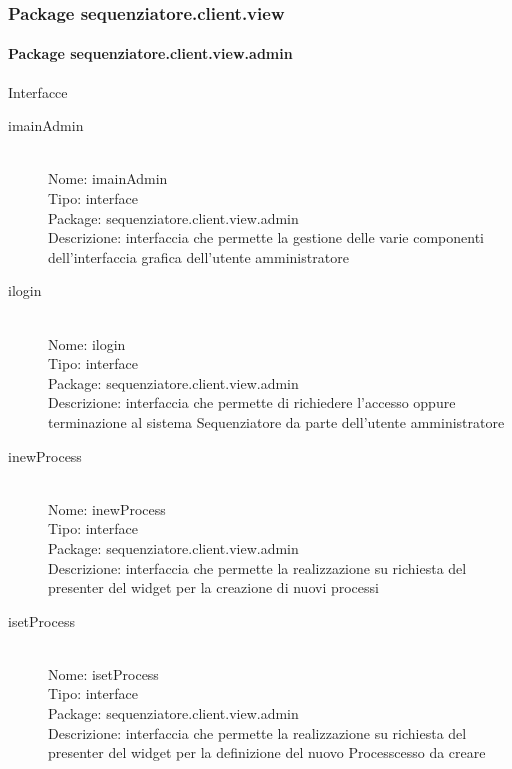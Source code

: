 \subsubsection{Package sequenziatore.client.view}
\paragraph{Package sequenziatore.client.view.admin}
Interfacce \\
\begin{description}
	\item[imainAdmin] 
  	\hfill \\
  	Nome: imainAdmin\\
  	Tipo: interface\\
	Package: sequenziatore.client.view.admin\\
	Descrizione: interfaccia che permette la gestione delle varie componenti 	dell'interfaccia grafica dell'utente amministratore
\end{description}

\begin{description}
	\item[ilogin] 
  	\hfill \\
  	Nome: ilogin\\
  	Tipo: interface\\
	Package: sequenziatore.client.view.admin\\
	Descrizione: interfaccia che permette di richiedere l'accesso oppure terminazione al sistema Sequenziatore da parte dell’utente amministratore
\end{description}

\begin{description}
	\item[inewProcess] 
  	\hfill \\
  	Nome: inewProcess\\
  	Tipo: interface\\
	Package: sequenziatore.client.view.admin\\
	Descrizione: interfaccia che permette la realizzazione su richiesta del presenter del widget per la creazione di nuovi processi
\end{description}

\begin{description}
	\item[isetProcess] 
  	\hfill \\
  	Nome: isetProcess\\
  	Tipo: interface\\
	Package: sequenziatore.client.view.admin\\
	Descrizione: interfaccia che permette la realizzazione su richiesta del presenter del widget per la definizione del nuovo Processcesso da creare
\end{description}

